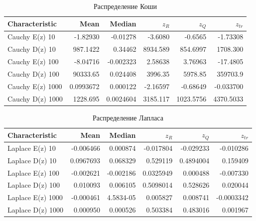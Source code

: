 	\begin{table}[ht]
	\centering
		\begin{tabular}[t]{lrrrrr}
			\hline
			Characteristic   &        Mean &    Median &            $z_R$ &       $z_Q$ &      $z_{tr}$ \\
			\hline
			Cauchy E(z) 10   &   -1.82930 &  -0.01278 &   -3.6080     &  -0.6565 &  -1.73308 \\
			Cauchy D(z) 10   &  987.1422    &  0.34462 & 8934.589       &  854.6997 &  1708.300 \\
			Cauchy E(z) 100  &   -8.04716  & -0.002323 & 2.58638      & 3.76963 & -17.4805 \\
			Cauchy D(z) 100  & 90333.65   &  0.024408 &    3996.35 &  5978.85 &  359703.9  \\
			Cauchy E(z) 1000 &   0.0993672  & 0.000122 &  -2.16597     &  -0.68649  & -0.033700 \\
			Cauchy D(z) 1000 & 1228.695   &  0.0024604 &    3185.117 &  1023.5756 &  4370.5033 \\
			\hline
		\end{tabular}
	\caption{Распределение Коши}
	\label{tab:cauchy}
	\end{table}
	
	\begin{table}[ht]
	\centering
		\begin{tabular}[t]{lrrrrr}
			\hline
			Characteristic    &      Mean &    Median &       $z_R$ &       $z_Q$ &      $z_{tr}$ \\
			\hline
			Laplace E(z) 10   &  -0.006466 &  0.000874 & -0.017804 &  -0.029233 &  -0.010286 \\
			Laplace D(z) 10   &  0.0967693 &  0.068329 &  0.529119 &  0.4894004 &  0.159409 \\
			Laplace E(z) 100  & -0.002621 & -0.002186 & 0.0325949 & 0.000488 & -0.007330 \\
			Laplace D(z) 100  &  0.010093 &  0.006105 &  0.5098014 &  0.528626 &  0.020044 \\
			Laplace E(z) 1000 &  -0.000461 &  4.5834-05 &  0.005827 &  0.008741 &  -0.0003342 \\
			Laplace D(z) 1000 &  0.000950 &  0.000526 &  0.503384 &  0.483016 &  0.001967 \\
			\hline
		\end{tabular}
		\caption{Распределение Лапласа}
		\label{tab:laplace}
	\end{table}

